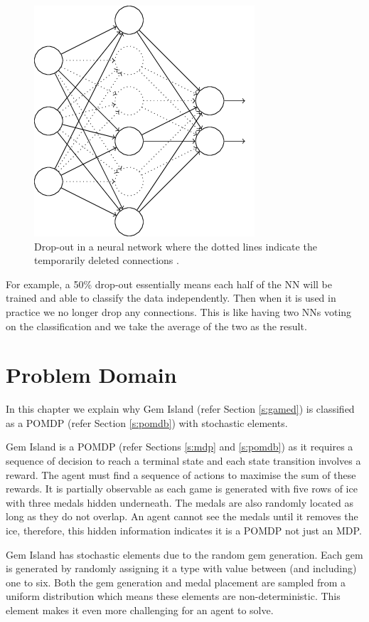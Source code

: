 \documentclass{bhamthesis}
\theoremstyle{definition}
\begin{document}
\begin{figure}
	\centering
	\includegraphics[width=.4\textwidth]{media/img/nnDropout}
	\caption{Drop-out in a neural network where the dotted lines indicate the temporarily deleted connections \cite{Neilsen2015}.}\label{f:nnDropout}
\end{figure}

For example, a 50\% drop-out essentially means each half of the NN will be trained and able to classify the data independently. Then when it is used in practice we no longer drop any connections. This is like having two NNs voting on the classification and we take the average of the two as the result.



\chapter{Problem Domain}\label{ch:pb}
In this chapter we explain why Gem Island (refer Section \ref{s:gamed}) is classified as a POMDP (refer Section \ref{s:pomdb}) with stochastic elements.

Gem Island is a POMDP (refer Sections \ref{s:mdp} and \ref{s:pomdb}) as it requires a sequence of decision to reach a terminal state and each state transition involves a reward. The agent must find a sequence of actions to maximise the sum of these rewards. It is partially observable as each game is generated with five rows of ice with three medals hidden underneath. The medals are also randomly located as long as they do not overlap. An agent cannot see the medals until it removes the ice, therefore, this hidden information indicates it is a POMDP not just an MDP.

Gem Island has stochastic elements due to the random gem generation. Each gem is generated by randomly assigning it a type with value between (and including) one to six. Both the gem generation and medal placement are sampled from a uniform distribution which means these elements are non-deterministic. This element makes it even more challenging for an agent to solve.
\end{document}
